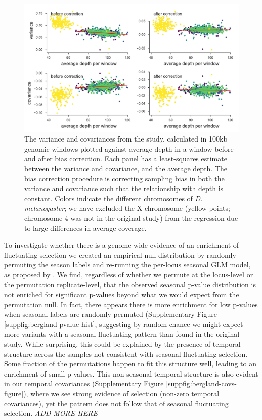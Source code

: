 \documentclass[11pt]{article}
\newcommand{\gc}[1]{{\it \color{red} #1 } }
\begin{document}
\begin{figure}[!ht]
  \centering
  \includegraphics[]{figures/bergland-correction-plot.pdf}

  \caption{The variance and covariances from the \textcite{Bergland2014-ij}
    study, calculated in 100kb genomic windows plotted against average depth in
    a window before and after bias correction. Each panel has a least-squares
    estimate between the variance and covariance, and the average depth.
    The bias correction procedure is correcting sampling bias in both the variance
    and covariance such that the relationship with depth is constant. Colors
    indicate the different chromosomes of \emph{D. melanogaster}; we have
    excluded the X chromosome (yellow points; chromosome 4 was not in the
    original study) from the regression due to large differences in average
    coverage.}

  \label{suppfig:bergland-correction}
\end{figure}



To investigate whether there is a genome-wide evidence of an enrichment of
fluctuating selection we created an empirical null distribution by randomly
permuting the season labels and re-running the per-locus seasonal GLM model, as
proposed by \parencite{Machado2018-cs}. We find, regardless of whether we
permute at the locus-level or the permutation replicate-level, that the
observed seasonal p-value distribution \textcite{Bergland2014-ij} is not
enriched for significant p-values beyond what we would expect from the
permutation null. In fact, there appears there is more enrichment for low
p-values when seasonal labels are randomly permuted (Supplementary Figure
\ref{suppfig:bergland-pvalue-hist}, suggesting by random chance we might expect
more variants with a seasonal fluctuating pattern than found in the original
\textcite{Bergland2014-ij} study. While surprising, this could be explained by
the presence of temporal structure across the samples not consistent with
seasonal fluctuating selection. Some fraction of the permutations happen to fit
this structure well, leading to an enrichment of small p-values. This
non-seasonal temporal structure is also evident in our temporal covariances
(Supplementary Figure \ref{suppfig:bergland-covs-figure}), where we see strong
evidence of selection (non-zero temporal covariances), yet the pattern does not
follow that of seasonal fluctuating selection.  \gc{ADD MORE HERE}
\end{document}
